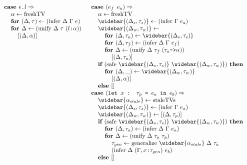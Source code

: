 \documentclass[acmsmall]{acmart}
\begin{document}
\begin{figure*}[h]
\[\begin{array}[t]{@{} l}
    \I \B{case } \code{$e$.$l$} \Rightarrow  
    \\
    \I\I \alpha \leftarrow \F{freshTV}
    \\
    \I\I \B{for } (\Delta, \tau) \leftarrow (\F{infer } \Delta\ \Gamma\ e)
    \\
    \I\I \B{for } \Delta \leftarrow (\F{unify } \Delta\ \tau\ (\code{$l$:$\alpha$}))
    \\
    \I\I\I [(\Delta, \alpha)]
\end{array}
\begin{array}[t]{@{} l}
    \I \B{case } (\code{$e_f$ $e_a$}) \Rightarrow  
    \\
    \I\I \alpha \leftarrow \F{freshTV}
    \\
    \I\I \widebar{(\Delta_s, \tau_s)} \leftarrow (\F{infer } \Gamma\ e_a)
    \\
    \I\I \widebar{(\Delta_w, \tau_w)} \leftarrow
    \\
    \I\I\I \B{for } (\Delta, \tau_a) \leftarrow \widebar{(\Delta_s, \tau_s)}
    \\
    \I\I\I \B{for } (\Delta, \tau_f) \leftarrow (\F{infer } \Delta\ \Gamma\ e_f)
    \\
    \I\I\I \B{for } \Delta \leftarrow (\F{unify } \Delta\ \tau_f\ (\code{$\tau_a$->$\alpha$}))
    \\
    \I\I\I\I [(\Delta, \tau_a)]
    \\
    \I\I \B{if } (\F{safe } \widebar{(\Delta_s, \tau_s)}\ \widebar{(\Delta_w, \tau_w)} ) \B{ then }
    \\
    \I\I\I \B{for } (\Delta, \_) \leftarrow \widebar{(\Delta_w, \tau_w)}
    \\
    \I\I\I\I [(\Delta, \alpha)]
    \\
    \I\I \B{else } [] 

    \\

    \I \B{case } (\code{let $x$ : $\tau_p$ = $e_a$ in $e_b$}) \Rightarrow  
    \\
    \I\I \widebar{\alpha_{stale}} \leftarrow \F{staleTVs}
    \\
    \I\I \widebar{(\Delta_s, \tau_s)} \leftarrow (\F{infer } \Gamma\ e_a)
    \\
    \I\I \widebar{(\Delta_w, \tau_w)} \leftarrow [(\Delta, \tau_p)]
    \\
    \I\I \B{if } (\F{safe } \widebar{(\Delta_s, \tau_s)}\ \widebar{(\Delta_w, \tau_w)} ) \B{ then }
    \\
    \I\I\I \B{for } (\Delta, \tau_a) \leftarrow (\F{infer } \Delta\ \Gamma\ e_a)
    \\
    \I\I\I \B{for } \Delta \leftarrow (\F{unify } \Delta\ \tau_a\ \tau_p)
    \\
    \I\I\I\I \tau_{gen} \leftarrow \F{generalize } \widebar{\alpha_{stale}}\ \Delta\ \tau_a
    \\
    \I\I\I\I (\F{infer } \Delta\ (\Gamma,\code{$x$:$\tau_{gen}$})\ e_b)
    \\
    \I\I \B{else } [] 


\end{array}\]
\end{figure*}
\end{document}
